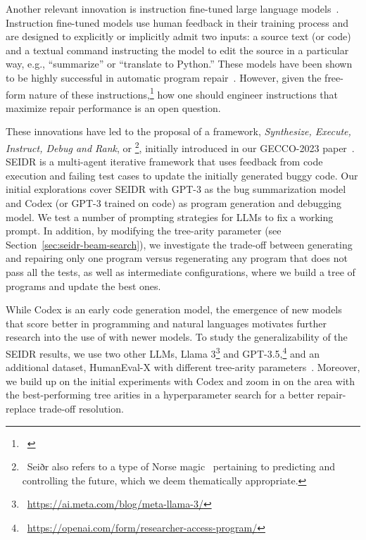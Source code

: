 Another relevant innovation is instruction fine-tuned large language models~\cite{ouyang2022:training}. Instruction fine-tuned models use human feedback in their training process and are designed to explicitly or implicitly admit two inputs: a source text (or code) and a textual command instructing the model to edit the source in a particular way, e.g., ``summarize'' or ``translate to Python.''
These models have been shown to be highly successful in automatic program repair~\cite{fan2023:automated}. 
However, given the free-form nature of these instructions,\footnote{~} how one should engineer instructions that maximize repair performance is an open question. 

These innovations have led to the proposal of a framework, \emph{Synthesize, Execute, Instruct, Debug and Rank}, or \method{}\footnote{~Seiðr also refers to a type of Norse magic~\cite{blain2002:nine} pertaining to predicting and controlling the future, which we deem thematically appropriate.}, initially introduced in our GECCO-2023 paper~\cite{liventsev2023:fully}. 
SEIDR is a multi-agent iterative framework that uses feedback from code execution and failing test cases to update the initially generated buggy code. 
Our initial explorations cover SEIDR with GPT-3 as the bug summarization model and Codex (or GPT-3 trained on code) as program generation and debugging model.  
We test a number of prompting strategies for LLMs to fix a working prompt.
In addition, by modifying the tree-arity parameter (see Section~\ref{sec:seidr-beam-search}), we investigate the trade-off between generating and repairing only one program versus regenerating any program that does not pass all the tests, as well as intermediate configurations, where we build a tree of programs and update the best ones.

While Codex is an early code generation model, the emergence of new models that score better in programming and natural languages motivates further research into the use of \method{} with newer models. 
To study the generalizability of the SEIDR results, we use two other LLMs, Llama 3\footnote{~\url{https://ai.meta.com/blog/meta-llama-3/}} and GPT-3.5,\footnote{~\url{https://openai.com/form/researcher-access-program/}} and an additional dataset, HumanEval-X with different tree-arity parameters~\cite{brown2020:language, chen2021:evaluating, zheng2023:codegeex}. 
Moreover, we build up on the initial experiments with Codex and zoom in on the area with the best-performing tree arities in a hyperparameter search for a better repair-replace trade-off resolution. 

